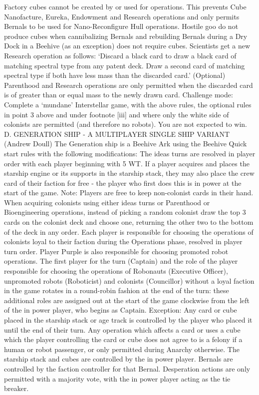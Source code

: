 \documentclass[a4paper]{book}
\begin{document}
Factory cubes cannot be created by or used for operations. This prevents Cube Nanofacture, Eureka, Endowment and Research operations and only permits Bernals to be used for Nano-Reconfigure Hull operations. Hostile goo do not produce cubes when cannibalizing Bernals and rebuilding Bernals during a Dry Dock in a Beehive (as an exception) does not require cubes.
Scientists get a new Research operation as follows: ‘Discard a black card to draw a black card of matching spectral type from any patent deck. Draw a second card of matching spectral type if both have less mass than the discarded card.’
(Optional) Parenthood and Research operations are only permitted when the discarded card is of greater than or equal mass to the newly drawn card.
Challenge mode: Complete a ‘mundane’ Interstellar game, with the above rules, the optional rules in point 3 above and under footnote [iii] and where only the white side of colonists are permitted (and therefore no robots). You are not expected to win.
D. GENERATION SHIP - A MULTIPLAYER SINGLE SHIP VARIANT (Andrew Doull)
The Generation ship is a Beehive Ark using the Beehive Quick start rules with the following modifications:
The ideas turns are resolved in player order with each player beginning with 5 WT. If a player acquires and places the starship engine or its supports in the starship stack, they may also place the crew card of their faction for free - the player who first does this is in power at the start of the game. Note: Players are free to keep non-colonist cards in their hand.
When acquiring colonists using either ideas turns or Parenthood or Bioengineering operations, instead of picking a random colonist draw the top 3 cards on the colonist deck and choose one, returning the other two to the bottom of the deck in any order.
Each player is responsible for choosing the operations of colonists loyal to their faction during the Operations phase, resolved in player turn order. Player Purple is also responsible for choosing promoted robot operations. The first player for the turn (Captain) and the role of the player responsible for choosing the operations of Robonauts (Executive Officer), unpromoted robots (Roboticist) and colonists (Councillor) without a loyal faction in the game rotates in a round-robin fashion at the end of the turn: these additional roles are assigned out at the start of the game clockwise from the left of the in power player, who begins as Captain. Exception: Any card or cube placed in the starship stack or age track is controlled by the player who placed it until the end of their turn.
Any operation which affects a card or uses a cube which the player controlling the card or cube does not agree to is a felony if a human or robot passenger, or only permitted during Anarchy otherwise. The starship stack and cubes are controlled by the in power player. Bernals are controlled by the faction controller for that Bernal. Desperation actions are only permitted with a majority vote, with the in power player acting as the tie breaker.
\end{document}
